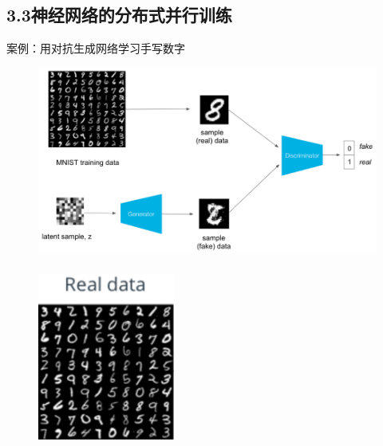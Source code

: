 \documentclass[9pt,t]{beamer} %
\begin{document}
\subsection{3.3神经网络的分布式并行训练}
\begin{frame}[t]{案例：用对抗生成网络学习手写数字}
\vspace{-0.54cm}
\begin{minipage}[t]{0.6 \textwidth}
\begin{figure}
\centering
\includegraphics[width=\textwidth]{GAN.png}
\ \\
\includegraphics[width=0.4\textwidth]{real-digit.png}
\end{figure}
\end{minipage}%
\begin{minipage}[t]{0.4 \textwidth}
\begin{figure}
\centering

\end{figure}
\end{minipage}
\end{frame}
\end{document}
